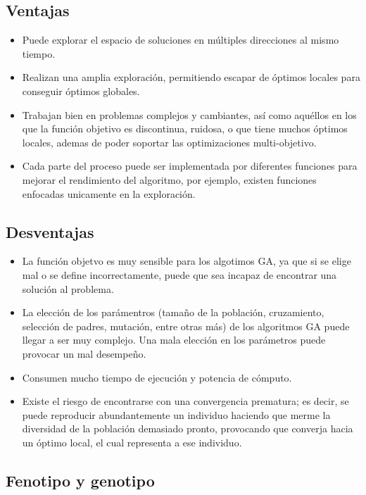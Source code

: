 \subsection{Ventajas}

\begin{itemize}
	\item Puede explorar el espacio de soluciones en múltiples direcciones al mismo tiempo.
	\item Realizan una amplia exploración, permitiendo escapar de óptimos locales para conseguir óptimos globales.
	\item Trabajan bien en problemas complejos y cambiantes, así como aquéllos en los que la función objetivo es discontinua, ruidosa, o que tiene muchos óptimos locales, ademas de poder soportar las optimizaciones multi-objetivo.
	\item Cada parte del proceso puede ser implementada por diferentes funciones para mejorar el rendimiento del algoritmo, por ejemplo, existen funciones enfocadas unicamente en la exploración.
	
\end{itemize}

\subsection{Desventajas}

\begin{itemize}
	\item La función objetvo es muy sensible para los algotimos GA, ya que si se elige mal o se define incorrectamente, puede que sea incapaz de encontrar una solución al problema.
	\item La elección de los parámentros (tamaño de la población, cruzamiento, selección de padres, mutación, entre otras más) de los algoritmos GA puede llegar a ser muy complejo. Una mala elección en los parámetros puede provocar un mal desempeño.
	\item Consumen mucho tiempo de ejecución y potencia de cómputo.
	\item Existe el riesgo de encontrarse con una convergencia prematura; es decir, se puede reproducir abundantemente un individuo haciendo que merme la diversidad de la población demasiado pronto, provocando que converja hacia un óptimo local, el cual representa a ese individuo.
\end{itemize}

\subsection{Fenotipo y genotipo}

